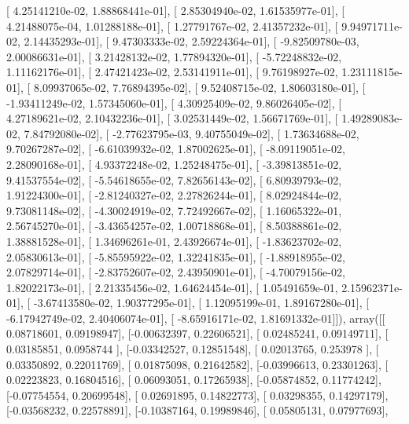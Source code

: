 \documentclass{article}
\begin{document}
       [  4.25141210e-02,   1.88868441e-01],
       [  2.85304940e-02,   1.61535977e-01],
       [  4.21488075e-04,   1.01288188e-01],
       [  1.27791767e-02,   2.41357232e-01],
       [  9.94971711e-02,   2.14435293e-01],
       [  9.47303333e-02,   2.59224364e-01],
       [ -9.82509780e-03,   2.00086631e-01],
       [  3.21428132e-02,   1.77894320e-01],
       [ -5.72248832e-02,   1.11162176e-01],
       [  2.47421423e-02,   2.53141911e-01],
       [  9.76198927e-02,   1.23111815e-01],
       [  8.09937065e-02,   7.76894395e-02],
       [  9.52408715e-02,   1.80603180e-01],
       [ -1.93411249e-02,   1.57345060e-01],
       [  4.30925409e-02,   9.86026405e-02],
       [  4.27189621e-02,   2.10432236e-01],
       [  3.02531449e-02,   1.56671769e-01],
       [  1.49289083e-02,   7.84792080e-02],
       [ -2.77623795e-03,   9.40755049e-02],
       [  1.73634688e-02,   9.70267287e-02],
       [ -6.61039932e-02,   1.87002625e-01],
       [ -8.09119051e-02,   2.28090168e-01],
       [  4.93372248e-02,   1.25248475e-01],
       [ -3.39813851e-02,   9.41537554e-02],
       [ -5.54618655e-02,   7.82656143e-02],
       [  6.80939793e-02,   1.91224300e-01],
       [ -2.81240327e-02,   2.27826244e-01],
       [  8.02924844e-02,   9.73081148e-02],
       [ -4.30024919e-02,   7.72492667e-02],
       [  1.16065322e-01,   2.56745270e-01],
       [ -3.43654257e-02,   1.00718868e-01],
       [  8.50388861e-02,   1.38881528e-01],
       [  1.34696261e-01,   2.43926674e-01],
       [ -1.83623702e-02,   2.05830613e-01],
       [ -5.85595922e-02,   1.32241835e-01],
       [ -1.88918955e-02,   2.07829714e-01],
       [ -2.83752607e-02,   2.43950901e-01],
       [ -4.70079156e-02,   1.82022173e-01],
       [  2.21335456e-02,   1.64624454e-01],
       [  1.05491659e-01,   2.15962371e-01],
       [ -3.67413580e-02,   1.90377295e-01],
       [  1.12095199e-01,   1.89167280e-01],
       [ -6.17942749e-02,   2.40406074e-01],
       [ -8.65916171e-02,   1.81691332e-01]]), array([[ 0.08718601,  0.09198947],
       [-0.00632397,  0.22606521],
       [ 0.02485241,  0.09149711],
       [ 0.03185851,  0.0958744 ],
       [-0.03342527,  0.12851548],
       [ 0.02013765,  0.253978  ],
       [ 0.03350892,  0.22011769],
       [ 0.01875098,  0.21642582],
       [-0.03996613,  0.23301263],
       [ 0.02223823,  0.16804516],
       [ 0.06093051,  0.17265938],
       [-0.05874852,  0.11774242],
       [-0.07754554,  0.20699548],
       [ 0.02691895,  0.14822773],
       [ 0.03298355,  0.14297179],
       [-0.03568232,  0.22578891],
       [-0.10387164,  0.19989846],
       [ 0.05805131,  0.07977693],
\end{document}
